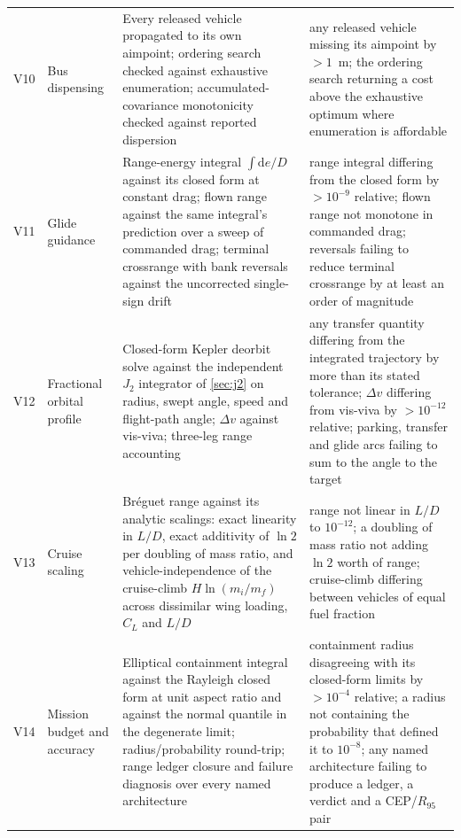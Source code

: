 \documentclass[11pt,a4paper]{article}
\theoremstyle{definition}
\numberwithin{equation}{section}
\begin{document}
\begin{center}
\begin{longtable}{@{}llp{5.4cm}p{3.4cm}@{}}
\addlinespace
V10 & Bus dispensing & Every released vehicle propagated to its own aimpoint; ordering search checked against exhaustive enumeration; accumulated-covariance monotonicity checked against reported dispersion & any released vehicle missing its aimpoint by $> 1$~m; the ordering search returning a cost above the exhaustive optimum where enumeration is affordable \\
\addlinespace
V11 & Glide guidance & Range-energy integral $\int \mathrm{d}e/D$ against its closed form at constant drag; flown range against the same integral's prediction over a sweep of commanded drag; terminal crossrange with bank reversals against the uncorrected single-sign drift & range integral differing from the closed form by $> 10^{-9}$ relative; flown range not monotone in commanded drag; reversals failing to reduce terminal crossrange by at least an order of magnitude \\
\addlinespace
V12 & Fractional orbital profile & Closed-form Kepler deorbit solve against the independent $J_2$ integrator of \cref{sec:j2} on radius, swept angle, speed and flight-path angle; $\Delta v$ against vis-viva; three-leg range accounting & any transfer quantity differing from the integrated trajectory by more than its stated tolerance; $\Delta v$ differing from vis-viva by $> 10^{-12}$ relative; parking, transfer and glide arcs failing to sum to the angle to the target \\
\addlinespace
V13 & Cruise scaling & Br\'eguet range against its analytic scalings: exact linearity in $L/D$, exact additivity of $\ln 2$ per doubling of mass ratio, and vehicle-independence of the cruise-climb $H\ln(m_i/m_f)$ across dissimilar wing loading, $C_L$ and $L/D$ & range not linear in $L/D$ to $10^{-12}$; a doubling of mass ratio not adding $\ln 2$ worth of range; cruise-climb differing between vehicles of equal fuel fraction \\
\addlinespace
V14 & Mission budget and accuracy & Elliptical containment integral against the Rayleigh closed form at unit aspect ratio and against the normal quantile in the degenerate limit; radius/probability round-trip; range ledger closure and failure diagnosis over every named architecture & containment radius disagreeing with its closed-form limits by $> 10^{-4}$ relative; a radius not containing the probability that defined it to $10^{-8}$; any named architecture failing to produce a ledger, a verdict and a CEP/$R_{95}$ pair \\
\bottomrule
\end{longtable}
\end{center}
\end{document}

